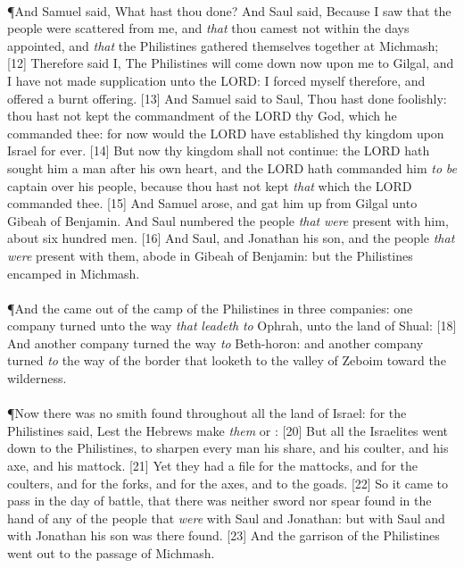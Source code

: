 \\
\P \textcolor[cmyk]{0.99998,1,0,0}{And Samuel said, What hast thou done? And Saul said, Because I saw that the people were scattered from me, and \emph{that} thou camest not within the days appointed, and \emph{that} the Philistines gathered themselves together at Michmash;}
[12] \textcolor[cmyk]{0.99998,1,0,0}{Therefore said I, The Philistines will come down now upon me to Gilgal, and I have not made supplication unto the LORD: I forced myself therefore, and offered a burnt offering.}
[13] \textcolor[cmyk]{0.99998,1,0,0}{And Samuel said to Saul, Thou hast done foolishly: thou hast not kept the commandment of the LORD thy God, which he commanded thee: for now would the LORD have established thy kingdom upon Israel for ever.}
[14] \textcolor[cmyk]{0.99998,1,0,0}{But now thy kingdom shall not continue: the LORD hath sought him a man after his own heart, and the LORD hath commanded him \emph{to} \emph{be} captain over his people, because thou hast not kept \emph{that} which the LORD commanded thee.}
[15] \textcolor[cmyk]{0.99998,1,0,0}{And Samuel arose, and gat him up from Gilgal unto Gibeah of Benjamin. And Saul numbered the people \emph{that} \emph{were} present with him, about six hundred men.}
[16] \textcolor[cmyk]{0.99998,1,0,0}{And Saul, and Jonathan his son, and the people \emph{that} \emph{were} present with them, abode in Gibeah of Benjamin: but the Philistines encamped in Michmash.}\\
\\
\P \textcolor[cmyk]{0.99998,1,0,0}{And the  came out of the camp of the Philistines in three companies: one company turned unto the way \emph{that} \emph{leadeth} \emph{to} Ophrah, unto the land of Shual:}
[18] \textcolor[cmyk]{0.99998,1,0,0}{And another company turned the way \emph{to} Beth-horon: and another company turned \emph{to} the way of the border that looketh to the valley of Zeboim toward the wilderness.}\\
\\
\P \textcolor[cmyk]{0.99998,1,0,0}{Now there was no smith found throughout all the land of Israel: for the Philistines said, Lest the Hebrews make \emph{them}  or :}
[20] \textcolor[cmyk]{0.99998,1,0,0}{But all the Israelites went down to the Philistines, to sharpen every man his share, and his coulter, and his axe, and his mattock.}
[21] \textcolor[cmyk]{0.99998,1,0,0}{Yet they had a file for the mattocks, and for the coulters, and for the forks, and for the axes, and to  the goads.}
[22] \textcolor[cmyk]{0.99998,1,0,0}{So it came to pass in the day of battle, that there was neither sword nor spear found in the hand of any of the people that \emph{were} with Saul and Jonathan: but with Saul and with Jonathan his son was there found.}
[23] \textcolor[cmyk]{0.99998,1,0,0}{And the garrison of the Philistines went out to the passage of Michmash.}